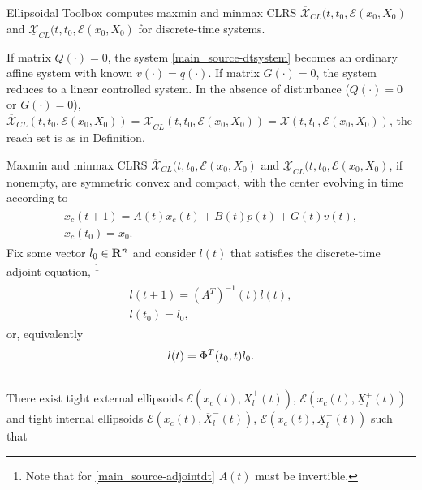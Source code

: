 \documentclass[letterpaper,10pt,english]{sphinxmanual}
\begin{document}
Ellipsoidal Toolbox computes maxmin and minmax CLRS
$\overline{{\mathcal X}}_{CL}(t, t_0, {\mathcal E}(x_0, X_0)$ and
$\underline{{\mathcal X}}_{CL}(t, t_0, {\mathcal E}(x_0, X_0)$ for
discrete-time systems.

If matrix $Q(\cdot)=0$, the system \eqref{main_source-dtsystem} becomes an
ordinary affine system with known $v(\cdot)=q(\cdot)$. If matrix
$G(\cdot)=0$, the system reduces to a linear controlled system. In
the absence of disturbance ($Q(\cdot)=0$ or $G(\cdot)=0$),
$\overline{{\mathcal X}}_{CL}(t,t_0,{\mathcal E}(x_0,X_0))=\underline{{\mathcal X}}_{CL}(t,t_0,{\mathcal E}(x_0,X_0))={\mathcal X}(t,t_0,{\mathcal E}(x_0,X_0))$,
the reach set is as in Definition.

Maxmin and minmax CLRS
$\overline{{\mathcal X}}_{CL}(t, t_0, {\mathcal E}(x_0, X_0)$ and
$\underline{{\mathcal X}}_{CL}(t, t_0, {\mathcal E}(x_0, X_0)$, if
nonempty, are symmetric convex and compact, with the center evolving in
time according to
\label{main_source:equation-fwdcenterd}\begin{gather}
\begin{split}x_c(t+1) = A(t)x_c(t) + B(t)p(t) + G(t)v(t), \\
x_c(t_0)= x_0.\end{split}\label{main_source-fwdcenterd}
\end{gather}
Fix some vector $l_0\in{\bf R}^n$ and consider $l(t)$ that
satisfies the discrete-time adjoint equation, \footnote{
Note that for \eqref{main_source-adjointdt} $A(t)$ must be invertible.
}
\label{main_source:equation-adjointdt}\begin{gather}
\begin{split}l(t+1) = \left(A^T\right)^{-1}(t)l(t), \\
l(t_0) = l_0,\end{split}\label{main_source-adjointdt}
\end{gather}
or, equivalently
\begin{gather}
\begin{split}l(t) = \Phi^T(t_0, t)l_0 .\end{split}\notag\\\begin{split}\end{split}\notag
\end{gather}
There exist tight external ellipsoids
${\mathcal E}(x_c(t), \overline{X}^+_l(t))$,
${\mathcal E}(x_c(t), \underline{X}^+_l(t))$ and tight internal
ellipsoids ${\mathcal E}(x_c(t), \overline{X}^-_l(t))$,
${\mathcal E}(x_c(t), \underline{X}^-_l(t))$ such that
\end{document}
